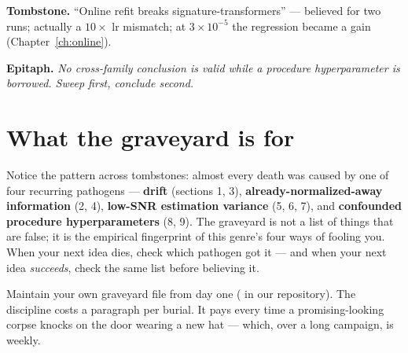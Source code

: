 \textbf{Tombstone.} ``Online refit breaks signature-transformers'' ---
believed for two runs; actually a $10\times$ lr mismatch; at
$3\times10^{-5}$ the regression became a gain
(Chapter~\ref{ch:online}).

\textbf{Epitaph.} \emph{No cross-family conclusion is valid while a
procedure hyperparameter is borrowed. Sweep first, conclude second.}

\section{What the graveyard is for}

Notice the pattern across tombstones: almost every death was caused by
one of four recurring pathogens --- \textbf{drift} (sections 1, 3),
\textbf{already-normalized-away information} (2, 4), \textbf{low-SNR
estimation variance} (5, 6, 7), and \textbf{confounded procedure
hyperparameters} (8, 9). The graveyard is not a list of things that are
false; it is the empirical fingerprint of this genre's four ways of
fooling you. When your next idea dies, check which pathogen got it ---
and when your next idea \emph{succeeds}, check the same list before
believing it.

Maintain your own graveyard file from day one
( in our repository). The discipline costs a
paragraph per burial. It pays every time a promising-looking corpse
knocks on the door wearing a new hat --- which, over a long campaign, is
weekly.
